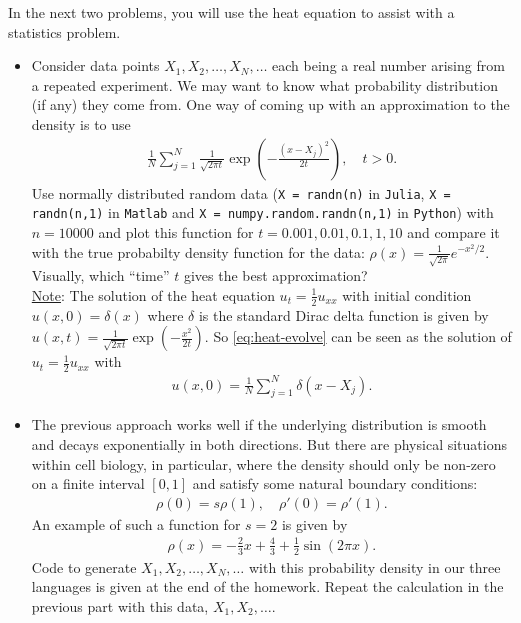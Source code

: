 \documentclass[12pt]{report}
\begin{document}
\begin{solution}
\end{solution}

\newpage



\begin{problem}
    In the next two problems, you will use the heat equation to assist with a statistics problem.
  \begin{itemize}  
\item Consider data points $X_1,X_2,\ldots,X_N,\ldots$ each being a real number arising from a repeated experiment.  We may want to know what probability distribution (if any) they come from.  One way of coming up with an approximation to the density is to use
  \begin{align}\label{eq:heat-evolve}
    \frac{1}{N} \sum_{j=1}^N \frac{1}{\sqrt{2 \pi t}} \exp \left( - \frac{(x - X_j)^2}{2t} \right), \quad t > 0.
  \end{align}
  Use normally distributed random data ({\tt X = randn(n)} in {\tt Julia},  {\tt X = randn(n,1)} in {\tt Matlab} and {\tt X = numpy.random.randn(n,1)} in {\tt Python}) with $n = 10000$ and plot this function for $t = 0.001,0.01,0.1,1,10$ and compare it with the true probabilty density function for the data:  $\rho(x) = \frac{1}{\sqrt{2 \pi}} e^{-x^2/2}$. Visually, which ``time'' $t$ gives the best approximation?\\

  \underline{Note}:  The solution of the heat equation $u_t = \frac 1 2 u_{xx}$ with initial condition $u(x,0) = \delta(x)$ where $\delta$ is the standard Dirac delta function is given by $u(x,t) = \frac{1}{\sqrt{2 \pi t}} \exp \left( - \frac{x^2}{2t} \right)$.  So \eqref{eq:heat-evolve} can be seen as the solution of $u_t = \frac 1 2 u_{xx}$ with
  \begin{align*}
    u(x,0) = \frac{1}{N} \sum_{j=1}^N \delta(x-X_j).
  \end{align*}

\item The previous approach works well if the underlying distribution is smooth and decays exponentially in both directions.  But there are physical situations within cell biology, in particular, where the density should only be non-zero on a finite interval $[0,1]$ and satisfy some natural boundary conditions:
  \begin{align*}
    \rho(0) = s \rho(1), \quad \rho'(0) = \rho'(1).
  \end{align*}
  An example of such a function for $s = 2$ is given by
  \begin{align*}
    \rho(x) = - \frac 2 3 x + \frac 4 3 + \frac 1 2 \sin(2 \pi x).
  \end{align*}
  Code to generate $X_1,X_2,\ldots,X_N,\ldots$ with this probability density in our three languages is given at the end of the homework.  Repeat the calculation in the previous part with this data, $X_1,X_2,\ldots$.
    

\end{itemize}
\end{problem}
\end{document}
